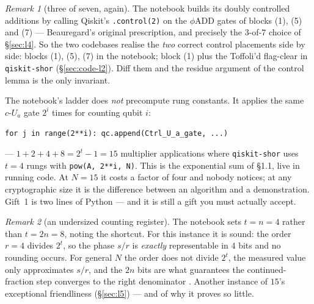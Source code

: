 \documentclass[11pt]{article}
\newcommand{\code}[1]{\texttt{#1}}
\theoremstyle{plain}
\theoremstyle{remark}
\newtheorem*{remark}{Remark}
\begin{document}
\begin{remark}[three of seven, again]
The notebook builds its doubly controlled additions by calling Qiskit's \code{.control(2)} on the
$\phi\mathrm{ADD}$ gates of blocks (1), (5) and (7) --- Beauregard's original prescription, and
precisely the $3$-of-$7$ choice of \S\ref{sec:l4}. So the two codebases realise the \emph{two}
correct control placements side by side: blocks (1), (5), (7) in the notebook; block (1) plus the
Toffoli'd flag-clear in \code{qiskit-shor} (\S\ref{sec:code-l2}). Diff them and the residue
argument of the control lemma is the only invariant.
\end{remark}

\begin{warnbox}[title={Gift 1, forgone}]
The notebook's ladder does \emph{not} precompute rung constants. It applies the same
$c\text{-}U_a$ gate $2^i$ times for counting qubit $i$:
\begin{center}
\code{for j in range(2**i): qc.append(Ctrl\_U\_a\_gate, ...)}
\end{center}
--- $1+2+4+8=2^t-1=15$ multiplier applications where \code{qiskit-shor} uses $t=4$ rungs with
\code{pow(A, 2**i, N)}. This is the exponential sum of \S1.1, live in running code. At $N=15$ it
costs a factor of four and nobody notices; at any cryptographic size it is the difference between
an algorithm and a demonstration. Gift~1 is two lines of Python --- and it is still a gift you
must actually accept.
\end{warnbox}

\begin{remark}[an undersized counting register]
The notebook sets $t=n=4$ rather than $t=2n=8$, noting the shortcut. For this instance it is
sound: the order $r=4$ divides $2^t$, so the phase $s/r$ is \emph{exactly} representable in $4$
bits and no rounding occurs. For general $N$ the order does not divide $2^t$, the measured value
only approximates $s/r$, and the $2n$ bits are what guarantees the continued-fraction step
converges to the right denominator \cite{shor,cemm}. Another instance of $15$'s exceptional
friendliness (\S\ref{sec:l5}) --- and of why it proves so little.
\end{remark}
\end{document}

